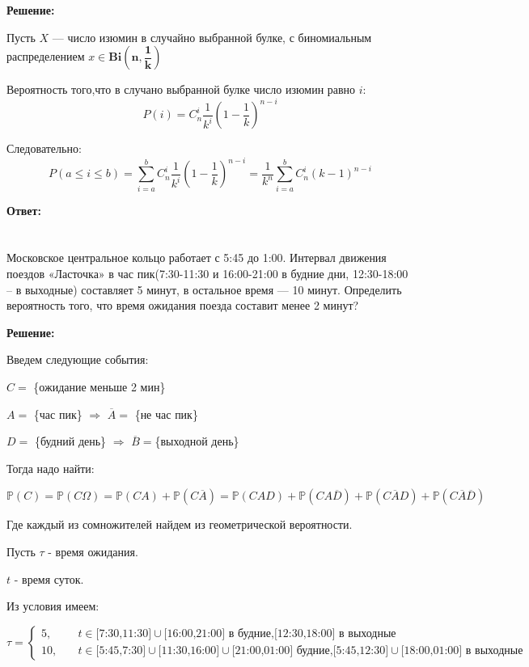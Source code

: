 \documentclass[a4paper,12pt]{article}
\newcommand{\lt}{\left}
\newcommand{\rt}{\right}
\newcommand{\ol}{\overline}
\newcommand{\bb}{\mathbb}
\newcommand{\om}{\Omega}
\begin{document}
\vspace{\baselineskip}

\textbf{Решение:}

Пусть $X$ — число изюмин в случайно выбранной булке, с биномиальным распределением $x \in \mathbf{Bi\lt(n, \dfrac{1}{k}\rt)}$

Вероятность того,что в случано выбранной булке число изюмин равно $i$:
$$ P(i) = C^i_n  \dfrac{1}{k^i}  \lt(1- \dfrac{1}{k}\rt)^{n-i}$$

Следовательно:
$$ P(a \leq i \leq b) = \sum \limits _{i=a}^b C^i_n  \dfrac{1}{k^i} \lt(1- \dfrac{1}{k}\rt)^{n-i} = \dfrac{1}{k^n} \sum \limits _{i=a} ^b C^i_n  \lt(k-1\rt)^{n-i}$$

\vspace{\baselineskip}


\textbf{Ответ:}

\section{}

Московское центральное кольцо работает с 5:45 до 1:00. Интервал движения
поездов «Ласточка» в час пик(7:30-11:30 и 16:00-21:00 в будние дни, 12:30-18:00
– в выходные) составляет 5 минут, в остальное время — 10 минут. Определить
вероятность того, что время ожидания поезда составит менее 2 минут?

\vspace{\baselineskip}

\textbf{Решение:}

\vspace{\baselineskip}

Введем следующие события:

$C =$ \{ожидание меньше 2 мин\}

$A =$ \{час пик\} $\Rightarrow$ $\ol A =$ \{не час пик\}

$D =$ \{будний день\} $\Rightarrow$ $\ol B =$\{выходной день\}

Тогда надо найти:

$\bb P(C) = \bb P(C\om) = \bb P(CA) + \bb P(C\ol A) = \bb P(CAD) +\bb P(CA\ol D) + \bb P(C\ol A D) +\bb P(C\ol A \ol D) $

Где каждый из сомножителей найдем из геометрической вероятности.

Пусть $\tau$ - время ожидания.

$t$ - время суток.

Из условия имеем:

\[
\tau = \left\{
\begin{aligned}
5,& \quad t\in \text{[7:30,11:30]}\cup \text{[16:00,21:00] в будние,} \text{[12:30,18:00] в выходные}\\
10,&\quad t\in \text{[5:45,7:30]}\cup \text{[11:30,16:00]}\cup \text{[21:00,01:00] будние,} \text{[5:45,12:30]}\cup \text{[18:00,01:00] в выходные}
\end{aligned}
\right.
\]
\end{document}
